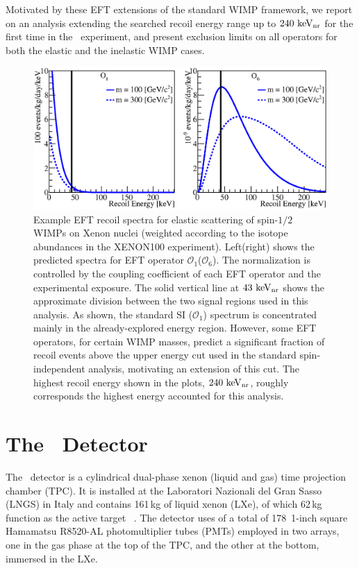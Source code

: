 Motivated by these EFT extensions of the standard WIMP framework, we report on an analysis extending the searched recoil energy range up to $240~\mathrm{keV_\mathrm{nr}}$ for the first time in the \Xehund\ experiment, and present exclusion limits on all operators for both the elastic and the inelastic WIMP cases.     


\begin{figure}[t!]
\centerline{\includegraphics[width=1.\linewidth]{Figures/drdeO1O6.eps}}
\caption{Example EFT recoil spectra for elastic scattering of spin-$1/2$ WIMPs on Xenon nuclei (weighted according to the isotope abundances in the XENON100 experiment). Left(right) shows the predicted spectra for EFT operator $\mathcal{O}_1$($\mathcal{O}_6$). The normalization is controlled by the coupling coefficient of each EFT operator and the experimental exposure. The solid vertical line at $43~\mathrm{keV_\mathrm{nr}}$ shows the approximate division between the two signal regions used in this analysis. As shown, the standard SI ($\mathcal{O}_1$) spectrum is concentrated mainly in the already-explored energy region. However, some EFT operators, for certain WIMP masses, predict a significant fraction of recoil events above the upper energy cut used in the standard spin-independent analysis, motivating an extension of this cut. The highest recoil energy shown in the plots, $240~\mathrm{keV_\mathrm{nr}}$, roughly corresponds the highest energy accounted for this analysis.}
\label{fig:dRdE}
\end{figure}

\section{The \Xehund\  Detector}
The \Xehund\ detector is a cylindrical %
dual-phase xenon (liquid and gas) time projection chamber (TPC). It is installed at the Laboratori Nazionali del Gran Sasso (LNGS) in Italy
and contains 161\,kg of liquid xenon (LXe), of which 62\,kg function as the active target ~\cite{xe100_instr2012}. 
The detector uses of a total of 178~1-inch square Hamamatsu R8520-AL photomultiplier tubes (PMTs) employed in two arrays, one in the gas phase at the top of the TPC, and the other at the bottom, immersed in the LXe. 

